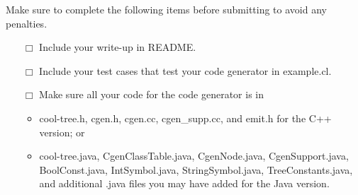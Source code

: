 \documentclass[11pt]{article}
\def\U#1{{\sf{}#1}}
\begin{document}
Make sure to complete the following items before submitting to avoid
any penalties.

\begin{minipage}{0.8\linewidth}
\bigskip
\begin{itemize}
  \item[$\Box$]
    Include your write-up in \U{README}.

  \item[$\Box$]
    Include your test cases that test your code generator
    in \U{example.cl}.

  \item[$\Box$]
    Make sure all your code for the code generator is in
    \begin{itemize}
    \item \U{cool-tree.h}, \U{cgen.h},
          \U{cgen.cc}, \U{cgen\_supp.cc}, and \U{emit.h} for the
          C++ version; or
    \item \U{cool-tree.java}, \U{CgenClassTable.java},
          \U{CgenNode.java}, \U{CgenSupport.java}, \U{BoolConst.java},
          \U{IntSymbol.java}, \U{StringSymbol.java},
          \U{TreeConstants.java}, and additional \U{.java} files you
          may have added for the Java version.
    \end{itemize}

\end{itemize}
\end{minipage}
\end{document}
